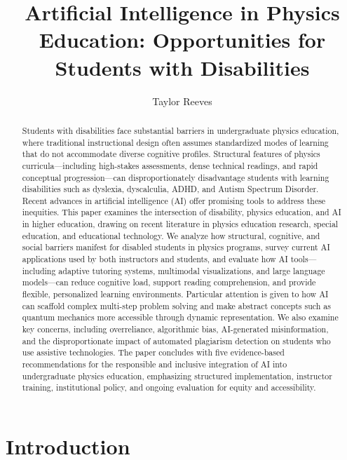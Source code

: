 \documentclass[]{aastex701}
\begin{document}
\title{Artificial Intelligence in Physics Education: Opportunities for Students with Disabilities}

\author{Taylor Reeves}

\begin{abstract}
Students with disabilities face substantial barriers in undergraduate physics education, where traditional instructional design often assumes standardized modes of learning that do not accommodate diverse cognitive profiles. Structural features of physics curricula---including high-stakes assessments, dense technical readings, and rapid conceptual progression---can disproportionately disadvantage students with learning disabilities such as dyslexia, dyscalculia, ADHD, and Autism Spectrum Disorder. Recent advances in artificial intelligence (AI) offer promising tools to address these inequities. This paper examines the intersection of disability, physics education, and AI in higher education, drawing on recent literature in physics education research, special education, and educational technology. We analyze how structural, cognitive, and social barriers manifest for disabled students in physics programs, survey current AI applications used by both instructors and students, and evaluate how AI tools---including adaptive tutoring systems, multimodal visualizations, and large language models---can reduce cognitive load, support reading comprehension, and provide flexible, personalized learning environments. Particular attention is given to how AI can scaffold complex multi-step problem solving and make abstract concepts such as quantum mechanics more accessible through dynamic representation. We also examine key concerns, including overreliance, algorithmic bias, AI-generated misinformation, and the disproportionate impact of automated plagiarism detection on students who use assistive technologies. The paper concludes with five evidence-based recommendations for the responsible and inclusive integration of AI into undergraduate physics education, emphasizing structured implementation, instructor training, institutional policy, and ongoing evaluation for equity and accessibility.
\end{abstract}


\section{Introduction}
\end{document}
